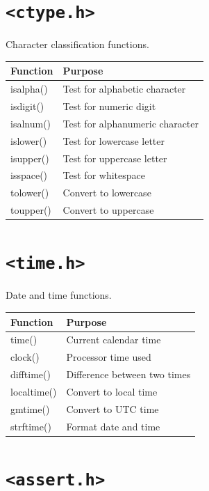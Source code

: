 \documentclass[12pt,openany]{book}
\begin{document}
\section{\texttt{<ctype.h>}}

Character classification functions.

\begin{center}
\begin{tabular}{|l|p{8cm}|}
\hline
Function & Purpose \\
\hline
isalpha() & Test for alphabetic character \\
isdigit() & Test for numeric digit \\
isalnum() & Test for alphanumeric character \\
islower() & Test for lowercase letter \\
isupper() & Test for uppercase letter \\
isspace() & Test for whitespace \\
tolower() & Convert to lowercase \\
toupper() & Convert to uppercase \\
\hline
\end{tabular}
\end{center}

\section{\texttt{<time.h>}}

Date and time functions.

\begin{center}
\begin{tabular}{|l|p{8cm}|}
\hline
Function & Purpose \\
\hline
time() & Current calendar time \\
clock() & Processor time used \\
difftime() & Difference between two times \\
localtime() & Convert to local time \\
gmtime() & Convert to UTC time \\
strftime() & Format date and time \\
\hline
\end{tabular}
\end{center}

\section{\texttt{<assert.h>}}
\end{document}
